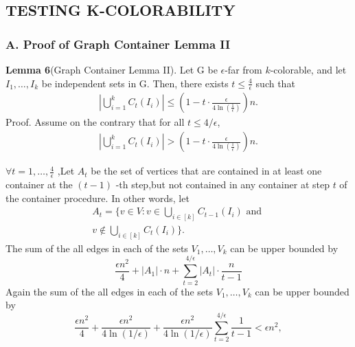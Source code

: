 \documentclass[preprint,11pt]{elsarticle}
\theoremstyle{definition}
\begin{document}
\begin{multicols}{2}
\section{TESTING K-COLORABILITY}
\subsubsection*{A. Proof of Graph Container Lemma II}
\textbf{Lemma 6}(Graph Container Lemma II).
Let G be $\epsilon$-far from
$k$-colorable, and let $I_1, \ldots, I_k$ be independent sets in G. Then,
there exists $t \leq \frac{4}{\epsilon}$ such that
\begin{align}
\left|\bigcup_{i=1}^{k} C_t(I_i)\right| \leq \left(1 - t \cdot \frac{\epsilon}{4 \ln(\frac{1}{\epsilon})}\right) n.
\tag{3}
\end{align}
Proof. Assume on the contrary that for all $t \leq 4/\epsilon$,
\begin{align}
\left|\bigcup_{i=1}^{k} C_t(I_i)\right| > \left(1 - t \cdot \frac{\epsilon}{4 \ln(\frac{1}{\epsilon})}\right) n.
\tag{4}
\end{align}

$\forall t = 1, \ldots, \frac{4}{\epsilon}$ ,Let  $A_t$  be the set of vertices that are contained in at least one container at the  $(t-1)$ -th step,but not contained in any container at step $t$  of the container procedure.
In other words, let 
\begin{align*}
A_t = \{v \in V: v \in \bigcup_{i \in [k]} C_{t-1}(I_i) \text{ and }\\
v \notin \bigcup_{i \in [k]} C_{t}(I_i) \}.
\end{align*}
The sum of the all edges in each of the sets $V_1,\ldots,V_k$ can be upper bounded by
\begin{equation}
\frac{\epsilon n^2}{4} + |A_1| \cdot n + \sum_{t=2}^{4/\epsilon} |A_t| \cdot \frac{n}{t-1}
\tag{5}
\end{equation}
Again the sum of the all edges in each of the sets $V_1,\ldots,V_k$ can be upper bounded by
\[
\frac{\epsilon n^2}{4} + \frac{\epsilon n^2}{4 \ln(1/\epsilon)} + \frac{\epsilon n^2}{4 \ln(1/\epsilon)} \sum_{t=2}^{4/\epsilon} \frac{1}{t-1} < \epsilon n^2,
\]

\end{multicols}
\end{document}

